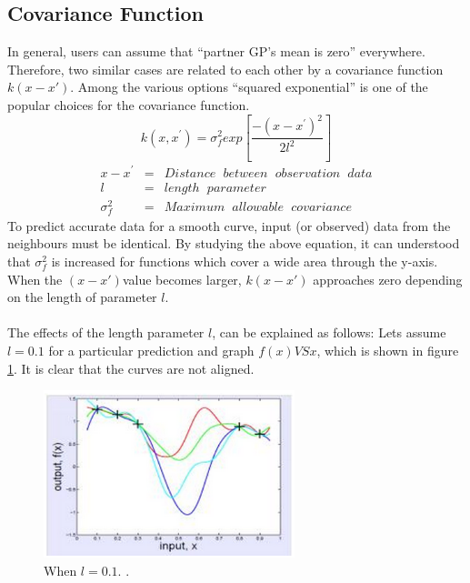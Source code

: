 \subsection{Covariance Function}
In general, users can assume that “partner GP’s mean is zero” everywhere\cite{simple-covariance}. Therefore, two similar cases are related to each other by a covariance function $ k(x-x') $. Among the various options “squared exponential” is one of the popular choices for the covariance function.
\begin{equation}
k(x,x^{'})=\sigma_{f}^{2}exp\left[ \dfrac{-(x-x^{'})^{2}}{2l^{2}} \right]
\label{eq:simple-covariance}
\end{equation}
\begin{eqnarray}
 x - x^{'} &=& Distance\hspace{7pt} between\hspace{7pt} observation\hspace{7pt} data    \nonumber \\
  l &=& length\hspace{7pt} parameter \nonumber \\
  \sigma_{f}^{2} &=& Maximum\hspace{7pt} allowable\hspace{7pt} covariance
\end{eqnarray}
To predict accurate data for a smooth curve, input (or observed) data from the neighbours must be identical. By studying the above equation, it can understood that $ \sigma_{f}^{2} $ is increased for functions which cover a wide area through the y-axis. When the $ (x-x') $value becomes larger, $k(x-x')$ approaches zero depending on the length of parameter $ l $.
\\\\
The effects of the length parameter $l$, can be explained as follows: Lets assume $l=0.1$ for a particular prediction and graph  $f(x)VS x$, which is shown in figure \ref{fig:length-parameter}. It is clear that the curves are not aligned\cite{intro-to-gpr}.
\begin{figure}[here]
  \centering
      \includegraphics[width=0.65\textwidth]{theory/graphics/effects-of-l.png}
  \caption{When $l = 0.1$. \cite{length-parameter}. }
  \label{fig:length-parameter}
\end{figure}
